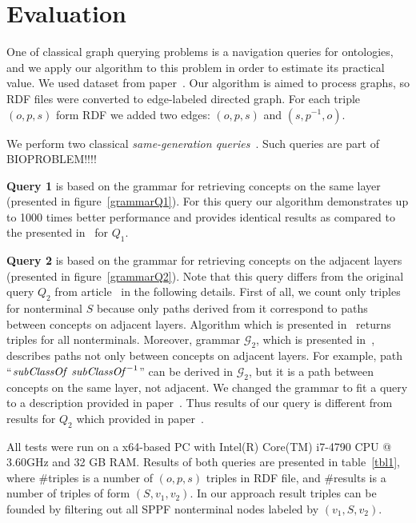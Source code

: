 \section{Evaluation}

One of classical graph querying problems is a navigation queries for ontologies, and we apply our algorithm to this problem in order to estimate its practical value.
We used dataset from paper~\cite{CFGonRDF}.
Our algorithm is aimed to process graphs, so RDF files were converted to edge-labeled directed graph.
For each triple $(o,p,s)$ form RDF we added two edges: $(o,p,s)$ and $(s,p^{-1},o)$.

We perform two classical \textit{same-generation queries}~\cite{FndDB}. Such queries are part of BIOPROBLEM!!!!

\textbf{Query 1} is based on the grammar for retrieving concepts on the same layer (presented in figure~\ref{grammarQ1}).
For this query our algorithm demonstrates up to 1000 times better performance and provides identical results as compared to the presented in~\cite{CFGonRDF} for $Q_1$. 

\textbf{Query 2} is based on the grammar for retrieving concepts on the adjacent layers (presented in figure~\ref{grammarQ2}). 
Note that this query differs from the original query $Q_2$ from article~\cite{CFGonRDF} in the following details.
First of all, we count only triples for nonterminal $S$ because only paths derived from it correspond to paths between concepts on adjacent layers.
Algorithm which is presented in~\cite{CFGonRDF} returns triples for all nonterminals.
Moreover, grammar $\mathcal{G}_2$, which is presented in~\cite{CFGonRDF}, describes paths not only between concepts on adjacent layers.
For example, path ``$\text{\textit{subClassOf} \textit{subClassOf}}^{-1}$'' can be derived in $\mathcal{G}_2$, but it is a path between concepts on the same layer, not adjacent.
We changed the grammar to fit a query to a description provided in paper~\cite{CFGonRDF}. 
Thus results of our query is different from results for $Q_2$ which provided in paper~\cite{CFGonRDF}.

All tests were run on a x64-based PC with Intel(R) Core(TM) i7-4790 CPU @ 3.60GHz and 32 GB RAM. 
Results of both queries are presented in table~\ref{tbl1}, where \#triples is a number of $(o,p,s)$ triples in RDF file, and \#results is a number of triples of form $(S,v_1,v_2)$.
In our approach result triples can be founded by filtering out all SPPF nonterminal nodes labeled by $(v_1,S,v_2)$.

